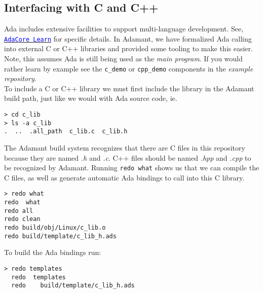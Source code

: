 \subsection{Interfacing with C and C++} \label{C Interfacing}

Ada includes extensive facilities to support multi-language development. See, \href{https://learn.adacore.com/courses/intro-to-embedded-sys-prog/chapters/multi_language_development.html}{\texttt{\textcolor{blue}{AdaCore Learn}}} for specific details. In Adamant, we have formalized Ada calling into external C or C++ libraries and provided some tooling to make this easier. Note, this assumes Ada is still being used as the \textit{main program}. If you would rather learn by example see the \texttt{c\_demo} or \texttt{cpp\_demo} components in the \textit{example repository}. \\

To include a C or C++ library we must first include the library in the Adamant build path, just like we would with Ada source code, ie.

\vspace{5mm} %
\begin{verbatim}
> cd c_lib
> ls -a c_lib
.  ..  .all_path  c_lib.c  c_lib.h
\end{verbatim}
\vspace{5mm} %

The Adamant build system recognizes that there are C files in this repository because they are named \textit{.h} and \textit{.c}. C++ files should be named \textit{.hpp} and \textit{.cpp} to be recognized by Adamant. Running \texttt{redo what} shows us that we can compile the C files, as well as generate automatic Ada bindings to call into this C library.

\vspace{5mm} %
\begin{verbatim}
> redo what
redo  what
redo all
redo clean
redo build/obj/Linux/c_lib.o
redo build/template/c_lib_h.ads
\end{verbatim}
\vspace{5mm} %

To build the Ada bindings run:

\vspace{5mm} %
\begin{verbatim}
> redo templates
  redo  templates
  redo    build/template/c_lib_h.ads
\end{verbatim}
\vspace{5mm} %

